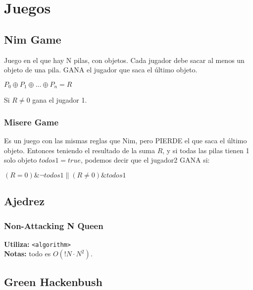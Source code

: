 \newpage
\section{Juegos}
\subsection{Nim Game}
\begin{flushleft}
Juego en el que hay N pilas, con objetos. Cada jugador debe sacar al menos un objeto de una pila. GANA el jugador que saca el \'ultimo objeto.
\end{flushleft}
$P_0{\oplus}P_1{\oplus}...{\oplus}P_n = R$
\begin{flushleft}
Si $R{\neq}0$ gana el jugador 1.
\end{flushleft}

\subsubsection{Misere Game}
\begin{flushleft}
Es un juego con las mismas reglas que Nim, pero PIERDE el que saca el \'ultimo objeto. Entonces teniendo el resultado de la suma $R$, y 
si todas las pilas tienen 1 solo objeto $todos1{=}true$, podemos decir que el jugador2 GANA si:
\end{flushleft}
${(R{=}0){\&}{\neg}{todos1}{\parallel}(R{\neq}0 ){\&}{todos1}}$
\subsection{Ajedrez}
\subsubsection{Non-Attacking N Queen}
\begin{footnotesize}
	\textbf{Utiliza:} \texttt{<algorithm>}\\
	\textbf{Notas:} todo es $ O(!N \cdot N^{2})$.
\end{footnotesize}

\subsection{Green Hackenbush}

